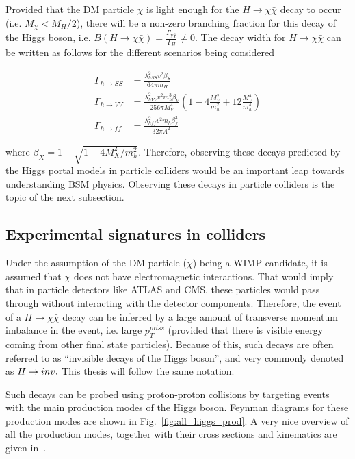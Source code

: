 Provided that the DM particle $\chi$ is light enough for the $H \rightarrow \chi \bar{\chi}$ decay to occur (i.e. $M_{\chi} < M_{H} / 2$), there will be a non-zero
branching fraction for this decay of the Higgs boson, i.e. $B(H \rightarrow \chi \bar{\chi}) = \frac{\Gamma_{\chi\bar{\chi}}}{\Gamma_{H}} \neq 0$. The decay width for
$H \rightarrow \chi \bar{\chi}$ can be written as follows for the different scenarios being considered~\cite{Djouadi:2011aa}

\begin{equation}
    \begin{split}
        \Gamma_{h \rightarrow SS} &= \frac{\lambda_{hSS}^{2} v^{2} \beta_{S}}{64 \pi m_{H}} \\
        \Gamma_{h \rightarrow VV} &= \frac{\lambda_{hVV}^{2} v^{2} m_{h}^{3} \beta_{V}}{256 \pi M_{V}^{4}} \left( 1 - 4 \frac{M_V^2}{m_h^2} + 12 \frac{M_V^4}{m_h^4} \right) \\
        \Gamma_{h \rightarrow ff} &= \frac{\lambda_{hff}^{2} v^{2} m_{h} \beta_{f}^{3}}{32 \pi \Lambda^{2}}
    \end{split}
\end{equation}

where $\beta_{X} = 1 - \sqrt{1 - 4 M_X^2 / m_h^2}$. 
Therefore, observing these decays predicted by the Higgs portal models in particle colliders would be an important
leap towards understanding BSM physics. Observing these decays in particle colliders is the topic of the next subsection.

\subsection{Experimental signatures in colliders}
\label{subsec:exp_signatures}

Under the assumption of the DM particle ($\chi$) being a WIMP candidate, it is assumed that $\chi$ does not have electromagnetic interactions. That would imply
that in particle detectors like ATLAS and CMS, these particles would pass through without interacting with the detector components. Therefore, the event of a
$H \rightarrow \chi \bar{\chi}$ decay can be inferred by a large amount of transverse momentum imbalance in the event, i.e. large $p_T^{miss}$ (provided that there
is visible energy coming from other final state particles). Because of this, such decays are often referred to as ``invisible decays of the Higgs boson'', and very
commonly denoted as $H \rightarrow inv.$ This thesis will follow the same notation.

Such decays can be probed using proton-proton collisions by targeting events with the main production modes of the Higgs boson. Feynman diagrams for these production 
modes are shown in Fig.~\ref{fig:all_higgs_prod}. A very nice overview of all the production modes, 
together with their cross sections and kinematics are given in~\cite{Djouadi:2005gi}.

